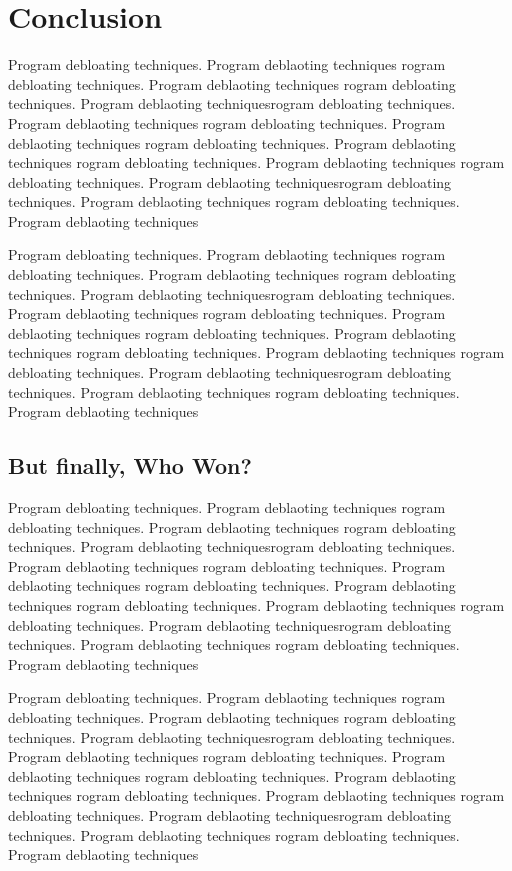 \documentclass{relatorio}
\begin{document}
\section{Conclusion}%
\label{Tools}

Program debloating techniques. Program deblaoting techniques rogram debloating techniques. Program deblaoting techniques
rogram debloating techniques. Program deblaoting techniquesrogram debloating techniques. Program deblaoting techniques
rogram debloating techniques. Program deblaoting techniques rogram debloating techniques. Program deblaoting techniques
rogram debloating techniques. Program deblaoting techniques 
rogram debloating techniques. Program deblaoting techniquesrogram debloating techniques. Program deblaoting techniques
rogram debloating techniques. Program deblaoting techniques

Program debloating techniques. Program deblaoting techniques rogram debloating techniques. Program deblaoting techniques
rogram debloating techniques. Program deblaoting techniquesrogram debloating techniques. Program deblaoting techniques
rogram debloating techniques. Program deblaoting techniques rogram debloating techniques. Program deblaoting techniques
rogram debloating techniques. Program deblaoting techniques 
rogram debloating techniques. Program deblaoting techniquesrogram debloating techniques. Program deblaoting techniques
rogram debloating techniques. Program deblaoting techniques

\subsection{But finally, Who Won?}%
\label{Tools}

Program debloating techniques. Program deblaoting techniques rogram debloating techniques. Program deblaoting techniques
rogram debloating techniques. Program deblaoting techniquesrogram debloating techniques. Program deblaoting techniques
rogram debloating techniques. Program deblaoting techniques rogram debloating techniques. Program deblaoting techniques
rogram debloating techniques. Program deblaoting techniques 
rogram debloating techniques. Program deblaoting techniquesrogram debloating techniques. Program deblaoting techniques
rogram debloating techniques. Program deblaoting techniques

Program debloating techniques. Program deblaoting techniques rogram debloating techniques. Program deblaoting techniques
rogram debloating techniques. Program deblaoting techniquesrogram debloating techniques. Program deblaoting techniques
rogram debloating techniques. Program deblaoting techniques rogram debloating techniques. Program deblaoting techniques
rogram debloating techniques. Program deblaoting techniques 
rogram debloating techniques. Program deblaoting techniquesrogram debloating techniques. Program deblaoting techniques
rogram debloating techniques. Program deblaoting techniques
\end{document}
